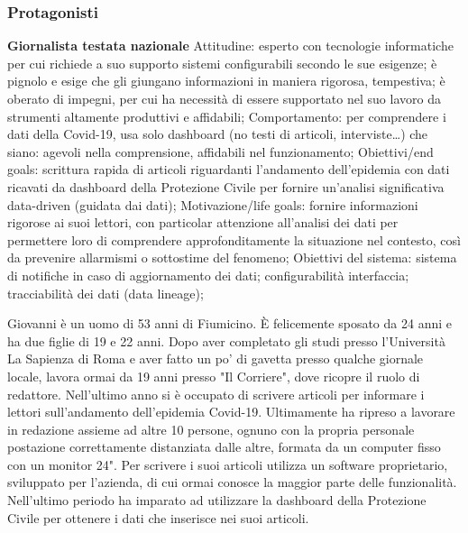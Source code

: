 \subsubsection*{Protagonisti}
\textbf{Giornalista testata nazionale}
	Attitudine:
		esperto con tecnologie informatiche per cui richiede a suo supporto sistemi configurabili secondo le sue esigenze;
		è pignolo e esige che gli giungano informazioni in maniera rigorosa, tempestiva;
		è oberato di impegni, per cui ha necessità di essere supportato nel suo lavoro da strumenti altamente produttivi e affidabili;
	Comportamento: per comprendere i dati della Covid-19, usa solo dashboard (no testi di articoli, interviste…) che siano:
			agevoli nella comprensione,
			affidabili nel funzionamento;
	Obiettivi/end goals: scrittura rapida di articoli riguardanti l'andamento dell'epidemia con dati ricavati da dashboard della Protezione Civile per fornire un'analisi significativa data-driven (guidata dai dati);
	Motivazione/life goals: fornire informazioni rigorose ai suoi lettori, con particolar attenzione all'analisi dei dati per permettere loro di comprendere approfonditamente la situazione nel contesto, così da prevenire allarmismi o sottostime del fenomeno;
	Obiettivi del sistema:
		sistema di notifiche in caso di aggiornamento dei dati;
		configurabilità interfaccia;
tracciabilità dei dati (data lineage);

Giovanni è un uomo di 53 anni di Fiumicino. È felicemente sposato da 24 anni e ha due figlie di 19 e 22 anni.
Dopo aver completato gli studi presso l'Università La Sapienza di Roma e aver fatto un po' di gavetta presso qualche giornale locale, lavora ormai da 19 anni presso "Il Corriere", dove ricopre il ruolo di redattore. Nell'ultimo anno si è occupato di scrivere articoli per informare i lettori sull'andamento dell'epidemia Covid-19. Ultimamente ha ripreso a lavorare in redazione assieme ad altre 10 persone, ognuno con la propria personale postazione correttamente distanziata dalle altre, formata da un computer fisso con un monitor 24".
Per scrivere i suoi articoli utilizza un software proprietario, sviluppato per l'azienda, di cui ormai conosce la maggior parte delle funzionalità. Nell'ultimo periodo ha imparato ad utilizzare la dashboard della Protezione Civile per ottenere i dati che inserisce nei suoi articoli.


